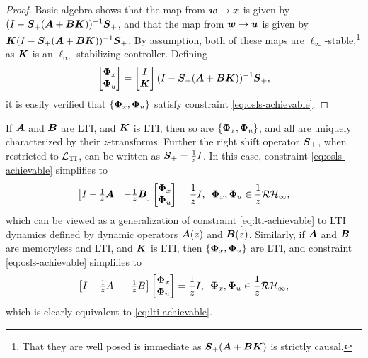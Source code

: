 \begin{proof}
Basic algebra shows that the map from $\boldsymbol{w} \to \boldsymbol{x}$ is given by $(I-\boldsymbol{S}_+(\boldsymbol{A}+\boldsymbol{B}\boldsymbol{K}))^{-1}\boldsymbol{S}_+$, and that the map from $\boldsymbol{w} \to \boldsymbol{u}$ is given by $\boldsymbol{K}(I-\boldsymbol{S}_+(\boldsymbol{A}+\boldsymbol{B}\boldsymbol{K}))^{-1}\boldsymbol{S}_+$.  By assumption, both of these maps are $\ell_\infty$-stable,\footnote{That they are well posed is immediate as $\boldsymbol{S}_+(\boldsymbol{A}+\boldsymbol{B}\boldsymbol{K})$ is strictly causal.} as $\boldsymbol{K}$ is an $\ell_\infty$-stabilizing controller.
Defining
\[
\begin{bmatrix}
\boldsymbol{\Phi}_x \\ \boldsymbol{\Phi}_u
\end{bmatrix} =
\begin{bmatrix} I \\ \boldsymbol{K} \end{bmatrix}(I-\boldsymbol{S}_+(\boldsymbol{A}+\boldsymbol{B}\boldsymbol{K}))^{-1}\boldsymbol{S}_+,
\]
it is easily verified that $\left\{\boldsymbol{\Phi}_x,\boldsymbol{\Phi}_u\right\}$ satisfy constraint \eqref{eq:osls-achievable}.
\end{proof}
\begin{remark}
If $\boldsymbol{A}$ and $\boldsymbol{B}$ are LTI, and $\boldsymbol{K}$ is LTI, then so are $\{\boldsymbol{\Phi}_x,\boldsymbol{\Phi}_u\}$, and all are uniquely characterized by their $z$-transforms.  Further the right shift operator $\boldsymbol{S}_+$, when restricted to $\mathcal{L}_{\mathrm{TI}}$, can be written as $\boldsymbol{S}_+=\frac{1}{z}I$.  In this case, constraint \eqref{eq:osls-achievable} simplifies to
\begin{equation}
\begin{bmatrix} I - \frac{1}{z}\boldsymbol{A}& -\frac{1}{z}\boldsymbol{B} \end{bmatrix} \begin{bmatrix} \boldsymbol{\Phi}_x \\ \boldsymbol{\Phi}_u\end{bmatrix} = \frac{1}{z}I, \, \ \boldsymbol{\Phi}_x, \boldsymbol{\Phi}_u \in \frac{1}{z}\mathcal{RH}_\infty,
\end{equation}
which can be viewed as a generalization of constraint \eqref{eq:lti-achievable} to LTI dynamics defined by dynamic operators $\boldsymbol{A}(z)$ and $\boldsymbol{B}(z)$.  Similarly, if $\boldsymbol{A}$ and $\boldsymbol{B}$ are memoryless and LTI, and $\boldsymbol{K}$ is LTI, then $\{\boldsymbol{\Phi}_x,\boldsymbol{\Phi}_u\}$ are LTI, and constraint \eqref{eq:osls-achievable} simplifies to
\begin{equation}
\begin{bmatrix} I - \frac{1}{z}A & -\frac{1}{z}B \end{bmatrix} \begin{bmatrix} \boldsymbol{\Phi}_x \\ \boldsymbol{\Phi}_u \end{bmatrix} = \frac{1}{z}I, \, \ \boldsymbol{\Phi}_x, \boldsymbol{\Phi}_u \in \frac{1}{z}\mathcal{RH}_\infty,
\end{equation}
which is clearly equivalent to \eqref{eq:lti-achievable}.
\end{remark}


